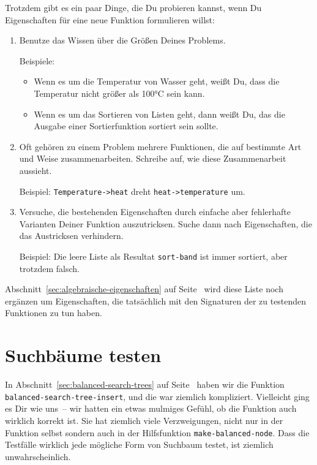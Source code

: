 Trotzdem gibt es ein paar Dinge, die Du probieren kannst, wenn Du
Eigenschaften für eine neue Funktion formulieren willst:
%
\begin{enumerate}
\item Benutze das Wissen über die Größen Deines Problems.

  Beispiele:

  \begin{itemize}
    \item Wenn es um die Temperatur von Wasser geht, weißt Du,
    dass die Temperatur nicht größer als 100\si{\degree}C sein kann.
  \item Wenn es um das Sortieren von Listen geht, dann weißt Du, das
    die Ausgabe einer Sortierfunktion sortiert sein sollte.
  \end{itemize}
\item Oft gehören zu einem Problem mehrere Funktionen, die auf
  bestimmte Art und Weise zusammenarbeiten.  Schreibe auf, wie diese
  Zusammenarbeit aussieht.

  Beispiel: \lstinline{Temperature->heat} dreht
  \lstinline{heat->temperature} um.
\item Versuche, die bestehenden Eigenschaften durch einfache aber
  fehlerhafte Varianten Deiner Funktion auszutricksen.
  Suche dann nach
  Eigenschaften, die das Austricksen verhindern.

  Beispiel: Die leere Liste als Resultat \lstinline{sort-band} ist
  immer sortiert, aber trotzdem falsch.
\end{enumerate}
%
Abschnitt~\ref{sec:algebraische-eigenschaften} auf
Seite~\pageref{sec:algebraische-eigenschaften} wird diese Liste noch
ergänzen um Eigenschaften, die tatsächlich mit den Signaturen der zu
testenden Funktionen zu tun haben.

\section{Suchbäume testen}
\label{sec:suchbaeume-testen}

%
In Abschnitt~\ref{sec:balanced-search-trees} auf
Seite~\pageref{sec:balanced-search-trees} haben wir die Funktion
\lstinline{balanced-search-tree-insert}, und die war ziemlich
kompliziert.  Vielleicht ging es Dir wie uns~-- wir hatten ein etwas
mulmiges Gefühl, ob die Funktion auch wirklich korrekt ist.
Sie hat ziemlich viele Verzweigungen, nicht nur in der Funktion selbst
sondern auch in der Hilfsfunktion \lstinline{make-balanced-node}.
Dass die Testfälle wirklich jede mögliche Form von Suchbaum testet,
ist ziemlich unwahrscheinlich.

